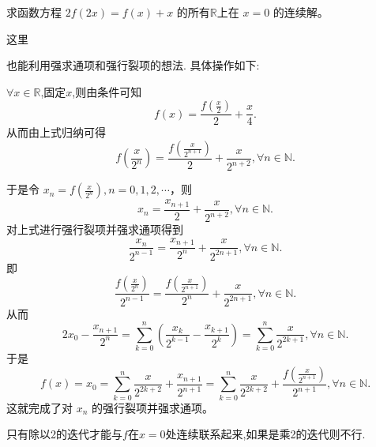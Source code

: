 \documentclass[../../main.tex]{subfiles}%
\begin{document}
\begin{example}
求函数方程 \(2f(2x)=f(x)+x\) 的所有\(\mathbb{R}\)上在 \(x = 0\) 的连续解。
\end{example}
\begin{note}
\hypertarget{注意到的原因见笔记部分123}{这里}也能利用强求通项和强行裂项的想法. 具体操作如下:

$\forall x\in \mathbb{R}$,固定$x$,则由条件可知
\[
f(x)=\frac{f\left(\frac{x}{2}\right)}{2}+\frac{x}{4}.
\]
从而由上式归纳可得
\[
f\left(\frac{x}{2^n}\right)=\frac{f\left(\frac{x}{2^{n + 1}}\right)}{2}+\frac{x}{2^{n + 2}},\forall n\in \mathbb{N}.
\]

于是令 \(x_n = f\left(\frac{x}{2^n}\right),n = 0,1,2,\cdots\)，则
\[
x_n=\frac{x_{n + 1}}{2}+\frac{x}{2^{n + 2}},\forall n\in \mathbb{N}.
\]
对上式进行强行裂项并强求通项得到
\[
\frac{x_n}{2^{n - 1}}=\frac{x_{n + 1}}{2^n}+\frac{x}{2^{2n + 1}},\forall n\in \mathbb{N}.
\]
即
\[
\frac{f\left(\frac{x}{2^n}\right)}{2^{n - 1}}=\frac{f\left(\frac{x}{2^{n + 1}}\right)}{2^n}+\frac{x}{2^{2n + 1}},\forall n\in \mathbb{N}.
\]
从而
\[
2x_0-\frac{x_{n + 1}}{2^n}=\sum_{k = 0}^n\left(\frac{x_k}{2^{k - 1}}-\frac{x_{k + 1}}{2^k}\right)=\sum_{k = 0}^n\frac{x}{2^{2k + 1}},\forall n\in \mathbb{N}.
\]
于是
\[
f(x)=x_0=\sum_{k = 0}^n\frac{x}{2^{2k + 2}}+\frac{x_{n + 1}}{2^{n + 1}}=\sum_{k = 0}^n\frac{x}{2^{2k + 2}}+\frac{f\left(\frac{x}{2^{n + 1}}\right)}{2^{n + 1}},\forall n\in \mathbb{N}.
\]
这就完成了对 \(x_n\) 的强行裂项并强求通项。
\end{note}
\begin{remark}
只有除以2的迭代才能与$f$在$x=0$处连续联系起来,如果是乘2的迭代则不行.
\end{remark}
\end{document}
